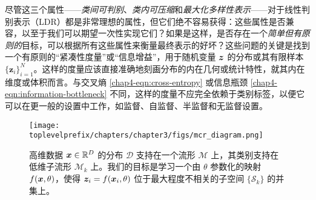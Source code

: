 \documentclass[../../book-main_zh.tex]{subfiles}
\begin{document}
尽管这三个属性——{\em 类间可判别}、{\em 类内可压缩}和{\em 最大化多样性表示}——对于线性判别表示（LDR）都是非常理想的属性，但它们绝不容易获得：这些属性是否兼容，以至于我们可以期望一次性实现它们？如果是这样，是否存在一个{\em 简单但有原则的}目标，可以根据所有这些属性来衡量最终表示的好坏？这些问题的关键是{找到}一个有原则的“紧凑性度量”或“信息增益”，用于随机变量 $\bm{z}$ 的分布或其有限样本 $\{\bm z_i\}_{i=1}^N$。这样的度量应该直接准确地刻画分布的内在几何或统计特性，就其内在维度或{体积}而言。与交叉熵 \eqref{chap4-eqn:cross-entropy} 或信息瓶颈 \eqref{chap4-eqn:information-bottleneck} 不同，这样的度量不应完全依赖于类别标签，以便它可以在更一般的设置中工作，如监督、自监督、半监督和无监督设置。

\begin{figure}
	\centering
	\texttt{[image: \\toplevelprefix/chapters/chapter3/figs/mcr\_diagram.png]}
	\caption{高维数据 $\bm{x}\in \mathbb{R}^D$ 的分布 $\mathcal D$ 支持在一个流形 $\mathcal{M}$ 上，其类别支持在低维子流形 $\mathcal{M}_k$ 上。我们的目标是学习一个由 $\theta$ 参数化的映射 $f(\bm{x}, \theta)$，使得 $\bm{z}_i = f(\bm{x}_i, \theta)$ 位于最大程度不相关的子空间 $\{\mathcal{S}_k\}$ 的并集上。}
	\label{chap4-fig:mcr-diagram}
\end{figure}
\end{document}
